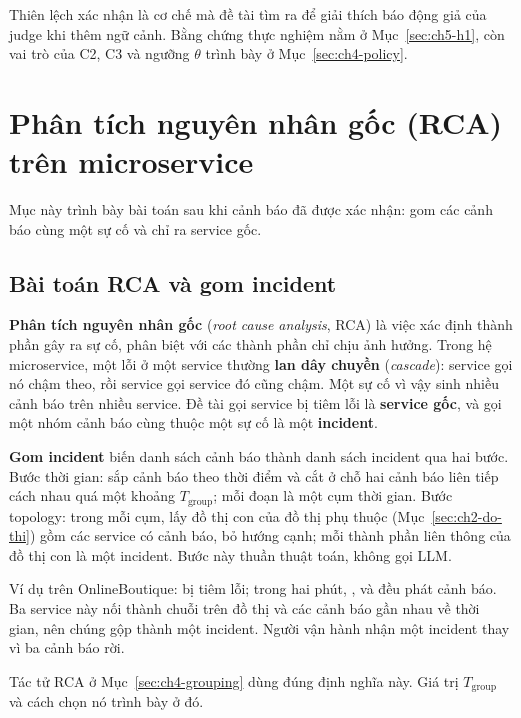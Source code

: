 Thiên lệch xác nhận là cơ chế mà đề tài tìm ra để giải thích báo động giả của judge khi thêm ngữ cảnh. Bằng chứng thực nghiệm nằm ở Mục~\ref{sec:ch5-h1}, còn vai trò của C2, C3 và ngưỡng $\theta$ trình bày ở Mục~\ref{sec:ch4-policy}.

\section{Phân tích nguyên nhân gốc (RCA) trên microservice}
\label{sec:ch2-rca}

Mục này trình bày bài toán sau khi cảnh báo đã được xác nhận: gom các cảnh báo cùng một sự cố và chỉ ra service gốc.

\subsection{Bài toán RCA và gom incident}
\label{sec:ch2-gom}

\textbf{Phân tích nguyên nhân gốc} (\emph{root cause analysis}, RCA) là việc xác định thành phần gây ra sự cố, phân biệt với các thành phần chỉ chịu ảnh hưởng. Trong hệ microservice, một lỗi ở một service thường \textbf{lan dây chuyền} (\emph{cascade}): service gọi nó chậm theo, rồi service gọi service đó cũng chậm. Một sự cố vì vậy sinh nhiều cảnh báo trên nhiều service. Đề tài gọi service bị tiêm lỗi là \textbf{service gốc}, và gọi một nhóm cảnh báo cùng thuộc một sự cố là một \textbf{incident}.

\textbf{Gom incident} biến danh sách cảnh báo thành danh sách incident qua hai bước. Bước thời gian: sắp cảnh báo theo thời điểm và cắt ở chỗ hai cảnh báo liên tiếp cách nhau quá một khoảng $T_{\mathrm{group}}$; mỗi đoạn là một cụm thời gian. Bước topology: trong mỗi cụm, lấy đồ thị con của đồ thị phụ thuộc (Mục~\ref{sec:ch2-do-thi}) gồm các service có cảnh báo, bỏ hướng cạnh; mỗi thành phần liên thông của đồ thị con là một incident. Bước này thuần thuật toán, không gọi LLM.

Ví dụ trên OnlineBoutique:  bị tiêm lỗi; trong hai phút, ,  và  đều phát cảnh báo. Ba service này nối thành chuỗi trên đồ thị và các cảnh báo gần nhau về thời gian, nên chúng gộp thành một incident. Người vận hành nhận một incident thay vì ba cảnh báo rời.

Tác tử RCA ở Mục~\ref{sec:ch4-grouping} dùng đúng định nghĩa này. Giá trị $T_{\mathrm{group}}$ và cách chọn nó trình bày ở đó.

